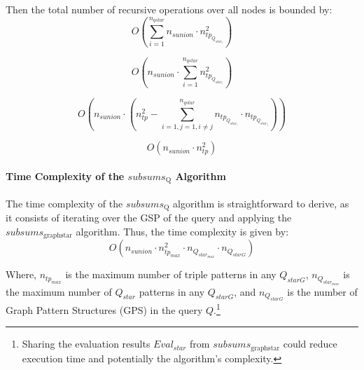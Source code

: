 Then the total number of recursive operations over all nodes is bounded by:
$$
O\left(\sum_{i=1}^{n_{qstar}} n_{sunion} \cdot n_{tp_{Q_{star_i}}}^{2}\right)
$$

$$
O\left(n_{sunion} \cdot \sum_{i=1}^{n_{qstar}} n_{tp_{Q_{star_i}}}^{2}\right)
$$

$$
O\left(n_{sunion} \cdot \left(n_{tp}^{2} - \sum_{i=1, j=1, i \neq j}^{n_{qstar}}  n_{tp_{Q_{star_i}}} \cdot  n_{tp_{Q_{star_j}}}\right)\right)
$$

$$
O\left(n_{sunion} \cdot n_{tp}^{2}\right)
$$

\paragraph{Time Complexity of the $subsums_{\mathrm{Q}}$ Algorithm}



The time complexity of the $subsums_{\mathrm{Q}}$ algorithm is straightforward to derive, as it consists of iterating over the GSP of the query and applying the $subsums_{\mathrm{graph star}}$ algorithm. Thus, the time complexity is given by:
\begin{equation}
O\left(n_{sunion} \cdot n_{tp_{max}}^{2} \cdot n_{Q_{star_{max}}} \cdot n_{Q_{starG}}\right)
\end{equation}

Where, $n_{tp_{max}}$ is the maximum number of triple patterns in any $Q_{starG}$,
$n_{Q_{star_{max}}}$ is the maximum number of $Q_{star}$ patterns in any $Q_{starG}$, and
$n_{Q_{starG}}$ is the number of Graph Pattern Structures (GPS) in the query $Q$.\footnote{
    Sharing the evaluation results $Eval_{star}$ from $subsums_{\mathrm{graph star}}$ could reduce execution time and potentially the algorithm's complexity.
}
